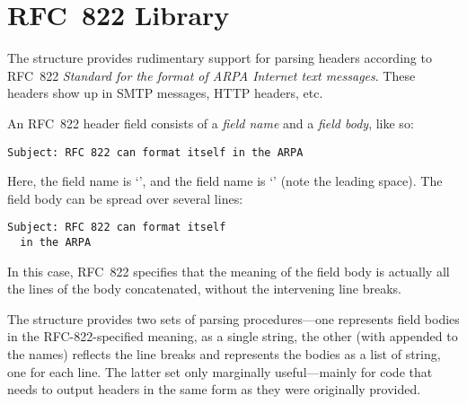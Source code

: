 \chapter{RFC~822 Library}\label{cha:rfc822}
%
The  structure provides rudimentary support for parsing
headers according to RFC~822 \textit{Standard for the format of ARPA
  Internet text messages}.  These headers show up in SMTP messages,
HTTP headers, etc.

An RFC~822 header field consists of a \textit{field name} and a
\textit{field body}, like so:
%
\begin{verbatim}
Subject: RFC 822 can format itself in the ARPA
\end{verbatim}
%
Here, the field name is `', and the field name is `' (note the leading space).
The field body can be spread over several lines:
%
\begin{verbatim}
Subject: RFC 822 can format itself
  in the ARPA
\end{verbatim}
%
In this case, RFC~822 specifies that the meaning of the field body is
actually all the lines of the body concatenated, without the
intervening line breaks.

The  structure provides two sets of parsing
procedures---one represents field bodies in the RFC-822-specified
meaning, as a single string, the other (with 
appended to the names) reflects the line breaks and represents the
bodies as a list of string, one for each line.  The latter set only
marginally useful---mainly for code that needs to output headers in
the same form as they were originally provided.


